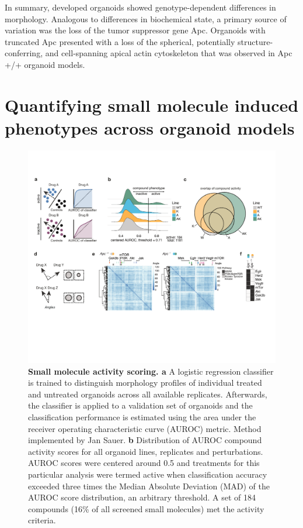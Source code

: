 \begin{flushleft}
In summary, developed organoids showed genotype-dependent differences in morphology. Analogous to differences in biochemical state, a primary source of variation was the loss of the tumor suppressor gene Apc. Organoids with truncated Apc presented with a loss of the spherical, potentially structure-conferring, and cell-spanning apical actin cytoskeleton that was observed in Apc +/+ organoid models.

\section{Quantifying small molecule induced phenotypes across organoid models}

\begin{figure}[h]
\centering
\includegraphics[width=\textwidth,
                height=\textheight,
                keepaspectratio]{figures/adenomaprofiling/pdf/fig_1_5.pdf}
\caption{\textbf{Small molecule activity scoring. a} A logistic regression classifier is trained to distinguish morphology profiles of individual treated and untreated organoids across all available replicates. Afterwards, the classifier is applied to a validation set of organoids and the classification performance is estimated using the area under the receiver operating characteristic curve (AUROC) metric. Method implemented by Jan Sauer.
\textbf{b} Distribution of AUROC compound activity scores for all organoid lines, replicates and perturbations. AUROC scores were centered around 0.5 and treatments for this particular analysis were termed active when classification accuracy exceeded three times the Median Absolute Deviation (MAD) of the AUROC score distribution, an arbitrary threshold. A set of 184 compounds (16\% of all screened small molecules) met the activity criteria. 
}
\end{figure}
\end{flushleft}

